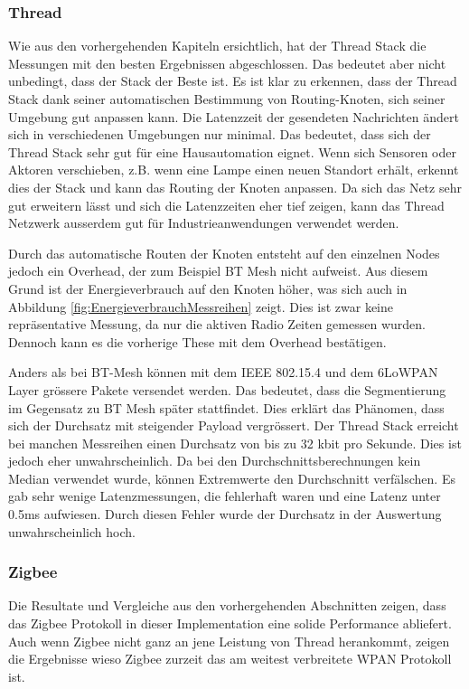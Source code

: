 \subsubsection{Thread}\label{subsubsec:FazitThread}
Wie aus den vorhergehenden Kapiteln ersichtlich, hat der Thread Stack die Messungen mit den besten Ergebnissen abgeschlossen.
Das bedeutet aber nicht unbedingt, dass der Stack der Beste ist.
Es ist klar zu erkennen, dass der Thread Stack dank seiner automatischen Bestimmung von Routing-Knoten, sich seiner Umgebung gut anpassen kann.
Die Latenzzeit der gesendeten Nachrichten ändert sich in verschiedenen Umgebungen nur minimal.
Das bedeutet, dass sich der Thread Stack sehr gut für eine Hausautomation eignet.
Wenn sich Sensoren oder Aktoren verschieben, z.B. wenn eine Lampe einen neuen Standort erhält, erkennt dies der Stack und kann das Routing der Knoten anpassen.
Da sich das Netz sehr gut erweitern lässt und sich die Latenzzeiten eher tief zeigen, kann das Thread Netzwerk ausserdem gut für Industrieanwendungen verwendet werden. 

Durch das automatische Routen der Knoten entsteht auf den einzelnen Nodes jedoch ein Overhead, der zum Beispiel BT Mesh nicht aufweist.
Aus diesem Grund ist der Energieverbrauch auf den Knoten höher, was sich auch in Abbildung \ref{fig:EnergieverbrauchMessreihen} zeigt. Dies ist zwar keine repräsentative Messung, da nur die aktiven Radio Zeiten gemessen wurden. Dennoch kann es die vorherige These mit dem Overhead bestätigen. 

Anders als bei BT-Mesh können mit dem IEEE 802.15.4 und dem 6LoWPAN Layer grössere Pakete versendet werden. Das bedeutet, dass die Segmentierung im Gegensatz zu BT Mesh später stattfindet. Dies erklärt das Phänomen, dass sich der Durchsatz mit steigender Payload vergrössert. Der Thread Stack erreicht bei manchen Messreihen einen Durchsatz von bis zu 32 kbit pro Sekunde. Dies ist jedoch eher unwahrscheinlich. Da bei den Durchschnittsberechnungen kein Median verwendet wurde, können Extremwerte den Durchschnitt verfälschen. Es gab sehr wenige Latenzmessungen, die fehlerhaft waren und eine Latenz unter 0.5ms aufwiesen. Durch diesen Fehler wurde der Durchsatz in der Auswertung unwahrscheinlich hoch. 

\subsubsection{Zigbee}\label{subsubsec:FazitZigbee}
Die Resultate und Vergleiche aus den vorhergehenden Abschnitten zeigen, dass das Zigbee Protokoll in dieser Implementation eine solide Performance abliefert.
Auch wenn Zigbee nicht ganz an jene Leistung von Thread herankommt, zeigen die Ergebnisse wieso Zigbee zurzeit das am weitest verbreitete WPAN Protokoll ist.

